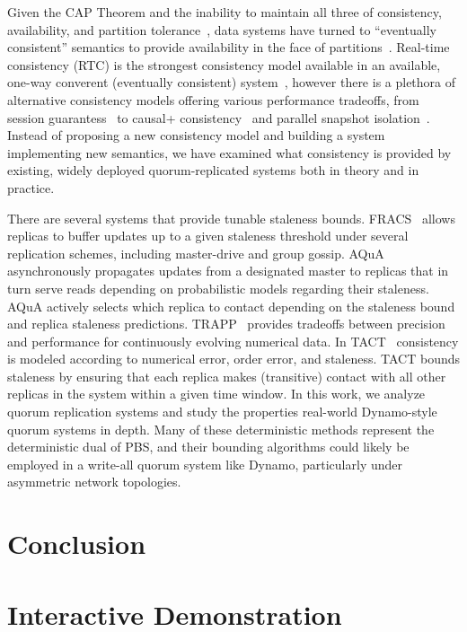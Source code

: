 \documentclass{vldb}
\begin{document}
Given the CAP Theorem and the inability to maintain all three of
consistency, availability, and partition tolerance~\cite{cap-proof},
data systems have turned to ``eventually consistent'' semantics to
provide availability in the face of
partitions~\cite{consistency-partitioning, vogels-defs}.  Real-time
consistency (RTC) is the strongest consistency model available in an
available, one-way converent (eventually consistent)
system~\cite{rtc-proof}, however there is a plethora of alternative
consistency models offering various performance tradeoffs, from
session guarantess~\cite{sessionguarantees} to causal+
consistency~\cite{cops} and parallel snapshot isolation~\cite{walter}.
Instead of proposing a new consistency model and building a system
implementing new semantics, we have examined what consistency is
provided by existing, widely deployed quorum-replicated systems both
in theory and in practice.

There are several systems that provide tunable staleness bounds.
FRACS~\cite{frac} allows replicas to buffer updates up to a given
staleness threshold under several replication schemes, including
master-drive and group gossip.  AQuA~\cite{aqua} asynchronously
propagates updates from a designated master to replicas that in turn
serve reads depending on probabilistic models regarding their
staleness.  AQuA actively selects which replica to contact depending
on the staleness bound and replica staleness predictions.
TRAPP~\cite{trapp} provides tradeoffs between precision and
performance for continuously evolving numerical data.  In
TACT~\cite{vahdat-article, vahdat-bounded} consistency is modeled
according to numerical error, order error, and staleness.  TACT bounds
staleness by ensuring that each replica makes (transitive) contact
with all other replicas in the system within a given time window.  In
this work, we analyze quorum replication systems and study the
properties real-world Dynamo-style quorum systems in depth.  Many of
these deterministic methods represent the deterministic dual of PBS,
and their bounding algorithms could likely be employed in a write-all
quorum system like Dynamo, particularly under asymmetric network
topologies.


\section{Conclusion}
\label{sec:conclusion}

\section*{Interactive Demonstration}
\end{document}

